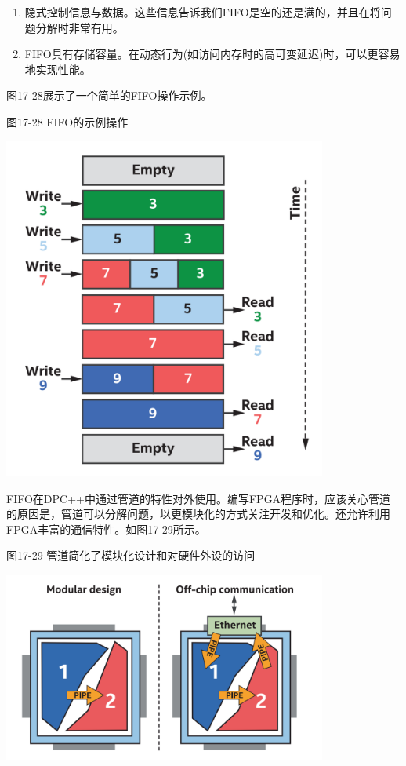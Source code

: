 \begin{enumerate}
	\item 隐式控制信息与数据。这些信息告诉我们FIFO是空的还是满的，并且在将问题分解时非常有用。
	\item FIFO具有存储容量。在动态行为(如访问内存时的高可变延迟)时，可以更容易地实现性能。
\end{enumerate}

图17-28展示了一个简单的FIFO操作示例。\par

\hspace*{\fill} \par %
图17-28 FIFO的示例操作
\begin{center}
	\includegraphics[width=0.8\textwidth]{content/chapter-17/images/23}
\end{center}

FIFO在DPC++中通过管道的特性对外使用。编写FPGA程序时，应该关心管道的原因是，管道可以分解问题，以更模块化的方式关注开发和优化。还允许利用FPGA丰富的通信特性。如图17-29所示。\par

\hspace*{\fill} \par %
图17-29 管道简化了模块化设计和对硬件外设的访问
\begin{center}
	\includegraphics[width=0.8\textwidth]{content/chapter-17/images/24}
\end{center}


